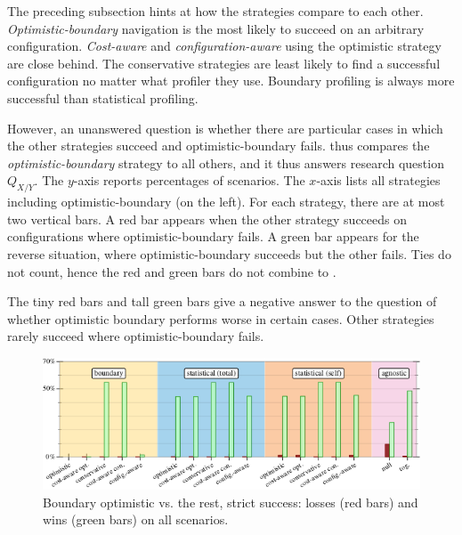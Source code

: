 The preceding subsection hints at how the strategies compare to each other.
\emph{Optimistic-boundary} navigation is the most likely to succeed on an
arbitrary configuration.  \emph{Cost-aware} and \emph{configuration-aware} using
the optimistic strategy are close behind.  The conservative strategies are least
likely to find a successful configuration no matter what profiler they use.
Boundary profiling is always more successful than statistical profiling.

However,
an unanswered question is whether there are particular cases in which the other
strategies succeed and optimistic-boundary fails.
 thus compares the \emph{optimistic-boundary} strategy to all
others, and it thus answers research question $Q_{X/Y}$.  The $y$-axis reports
percentages of scenarios.  The $x$-axis lists all strategies including
optimistic-boundary (on the left).  For each strategy, there are at most two
vertical bars.  A red bar appears when the other strategy succeeds on
configurations where optimistic-boundary fails.  A green bar appears for the
reverse situation, where optimistic-boundary succeeds but the other fails.  Ties
do not count,  hence the red and green bars do not combine to .

The tiny red bars and tall green bars give a negative answer to
the question of whether optimistic boundary performs worse in
certain cases.
Other strategies rarely succeed where optimistic-boundary fails.

\begin{figure}[t]
  \includegraphics[width=0.9\columnwidth]{data/head-to-head.pdf}
  \caption{Boundary optimistic vs. the rest, strict success: losses (red bars) and wins (green bars) on all scenarios.}
  \label{f:head-to-head}
\end{figure}

